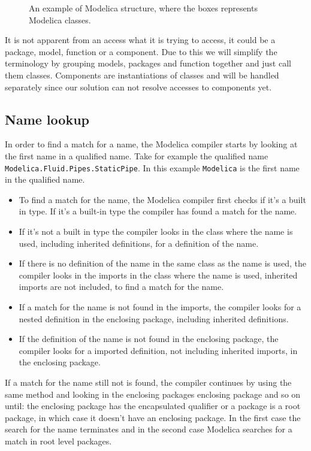 \documentclass{cslthse-msc}
\begin{document}
\begin{figure}[!htbp]
    \centering
    \qquad
    \subfloat{\raisebox{3.2 cm}{}}
    \caption{An example of Modelica structure, where the boxes represents Modelica classes.}
    \label{fig:modelicaExample}
\end{figure}

It is not apparent from an access what it is trying to access, it could be a package, model, function or a component. Due to this we will simplify the terminology by grouping models, packages and function together and just call them classes. Components are instantiations of classes and will be handled separately since our solution can not resolve accesses to components yet.

\subsection{Name lookup}
In order to find a match for a name, the Modelica compiler starts by looking at the first name in a qualified name. \cite{modelicamodelica, tillermodelica} Take for example the qualified name \\ \texttt{Modelica.Fluid.Pipes.StaticPipe}. In this example \texttt{Modelica} is the first name in the qualified name.
\begin{itemize}
\item To find a match for the name, the Modelica compiler first checks if it's a built in type. If it's a built-in type the compiler has found a match for the name.

\item If it's not a built in type the compiler looks in the class where the name is used, including inherited definitions, for a definition of the name. 

\item If there is no definition of the name in the same class as the name is used, the compiler looks in the imports in the class where the name is used, inherited imports are not included, to find a match for the name.

\item If a match for the name is not found in the imports, the compiler looks for a nested definition in the enclosing package, including inherited definitions.

\item If the definition of the name is not found in the enclosing package, the compiler looks for a imported definition, not including inherited imports, in the enclosing package.
\end{itemize}
If a match for the name still not is found, the compiler continues by using the same method and looking in the enclosing packages enclosing package and so on until: the enclosing package has the encapsulated qualifier or a package is a root package, in which case it doesn't have an enclosing package. In the first case the search for the name terminates and in the second case Modelica searches for a match in root level packages.
\end{document}
